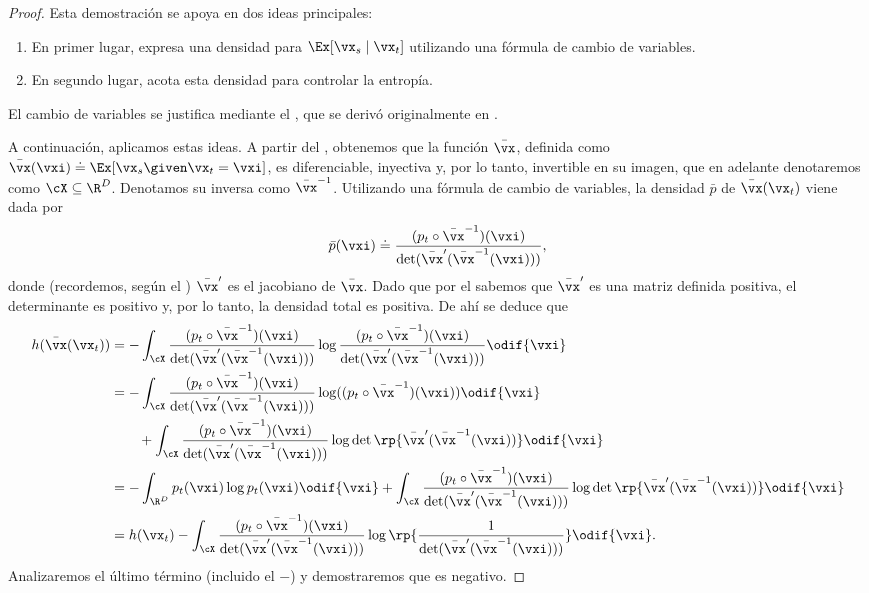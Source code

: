 \documentclass[../../book-main_es.tex]{subfiles}
\begin{document}
\begin{proof}
    Esta demostración se apoya en dos ideas principales:
    \begin{enumerate}
        \item En primer lugar, expresa una densidad para \(\Ex[\vx_{s} \mid
            \vx_{t}]\) utilizando una fórmula de cambio de variables.
        \item En segundo lugar, acota esta densidad para controlar la entropía.
    \end{enumerate}
    El cambio de variables se justifica mediante el ,
    que se derivó originalmente en \cite{Gribonval2011-pf}.

    A continuación, aplicamos estas ideas. A partir del ,
    obtenemos que la función \(\bar{\vx}\), definida como
    \(\bar{\vx}(\vxi) \doteq \Ex[\vx_{s} \given \vx_{t} = \vxi]\), es
    diferenciable, inyectiva y, por lo tanto, invertible en su imagen,
    que en adelante denotaremos como \(\cX \subseteq \R^{D}\). Denotamos
    su inversa como \(\bar{\vx}^{-1}\). Utilizando una fórmula de cambio de variables,
    la densidad \(\bar{p}\) de \(\bar{\vx}(\vx_{t})\) viene dada por
    \begin{equation}
        \bar{p}(\vxi) \doteq \frac{(p_{t} \circ
        \bar{\vx}^{-1})(\vxi)}{\det(\bar{\vx}^{\prime}(\bar{\vx}^{-1}(\vxi)))},
    \end{equation}
    donde (recordemos, según el ) \(\bar{\vx}^{\prime}\)
    es el jacobiano de \(\bar{\vx}\). Dado que por el
     sabemos que \(\bar{\vx}^{\prime}\) es una
    matriz definida positiva, el determinante es positivo y, por lo tanto, la
    densidad total es positiva. De ahí se deduce que
    \begin{align}
        h(\bar{\vx}(\vx_{t}))
        &= -\int_{\cX}\frac{(p_{t} \circ
        \bar{\vx}^{-1})(\vxi)}{\det(\bar{\vx}^{\prime}(\bar{\vx}^{-1}(\vxi)))}
        \log \frac{(p_{t} \circ
        \bar{\vx}^{-1})(\vxi)}{\det(\bar{\vx}^{\prime}(\bar{\vx}^{-1}(\vxi)))}
        \odif{\vxi} \\
        &= -\int_{\cX}\frac{(p_{t} \circ
        \bar{\vx}^{-1})(\vxi)}{\det(\bar{\vx}^{\prime}(\bar{\vx}^{-1}(\vxi)))}
        \log((p_{t} \circ \bar{\vx}^{-1})(\vxi))\odif{\vxi} \\
        &\qquad + \int_{\cX}\frac{(p_{t} \circ
        \bar{\vx}^{-1})(\vxi)}{\det(\bar{\vx}^{\prime}(\bar{\vx}^{-1}(\vxi)))}\log\det\rp{\bar{\vx}^{\prime}(\bar{\vx}^{-1}(\vxi))}\odif{\vxi}
        \\
        &= -\int_{\R^{D}}p_{t}(\vxi)\log p_{t}(\vxi)\odif{\vxi}
        + \int_{\cX}\frac{(p_{t} \circ
        \bar{\vx}^{-1})(\vxi)}{\det(\bar{\vx}^{\prime}(\bar{\vx}^{-1}(\vxi)))}\log\det\rp{\bar{\vx}^{\prime}(\bar{\vx}^{-1}(\vxi))}\odif{\vxi}
        \\
        &= h(\vx_{t}) - \int_{\cX}\frac{(p_{t} \circ
        \bar{\vx}^{-1})(\vxi)}{\det(\bar{\vx}^{\prime}(\bar{\vx}^{-1}(\vxi)))}\log\rp{\frac{1}{\det(\bar{\vx}^{\prime}(\bar{\vx}^{-1}(\vxi)))}}\odif{\vxi}.
    \end{align}
    Analizaremos el último término (incluido el \(-\)) y demostraremos que
    es negativo.


\end{proof}
\end{document}
